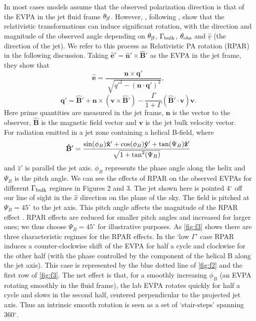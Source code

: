 	In most cases models assume that the observed polarization direction is that of the EVPA in the jet fluid frame $\theta_{\rm jf}$. However, \citet{lyutikov_polarization_2003}, following  \citet{blandford_relativistic_1979}, show that the relativistic transformations can induce significant rotation, with the direction and magnitude of the observed angle depending on $\theta_{\rm jf}$, $\Gamma_{\rm bulk}$, $\theta_{\rm obs}$ and $\underline{\hat{v}}$ (the direction of the jet). We refer to this process as Relativistic PA rotation (RPAR) in the following discussion. Taking $\mathbf{\hat{e}' = \hat{n}' \times \hat{B}'}$ as the EVPA in the jet frame, they show that 
\begin{equation}
\mathbf{\hat{e}} = \frac{\mathbf{n \times q'}}{\sqrt[]{q'^2 - (\mathbf{n \cdot q'})^2}},
\end{equation}
\begin{equation}
\mathbf{q'} = \mathbf{\hat{B}' + n \times (v \times \hat{B}')} - \frac{\Gamma}{1+\Gamma}(\mathbf{\hat{B}' \cdot v})\mathbf{v}.
\end{equation}
Here prime quantities are measured in the jet frame, $\mathbf{n}$ is the vector to the observer, $\mathbf{\hat{B}}$ is the magnetic field vector and $\mathbf{v}$ is the jet bulk velocity vector.\\

For radiation emitted in a jet zone containing a helical B-field, where
\begin{equation}
\mathbf{\hat{B}'} = \frac{{\rm sin}(\phi_B)\mathbf{\hat{x}'} + {\rm cos}(\phi_B)\mathbf{\hat{y}'} + {\rm tan}(\Psi_B)\mathbf{\hat{z}'}}{\sqrt{1+{\rm tan}^2(\Psi_B)}}
\end{equation}
and $\hat{z}'$ is parallel the jet axis. $\phi_B$ represents the phase angle along the helix and $\Psi_B$ is the pitch angle.
We can see the effects of RPAR on the observed EVPAs for different $\Gamma_{\rm bulk}$ regimes in Figures 2 and 3. The jet shown here is pointed 4$^{\circ}$ off our line of sight in the $\hat{x}$ direction on the plane of the sky. The field  is pitched at $\Psi_B=45^\circ$ to the jet axis.
This pitch angle affects the magnitude of the RPAR effect \citep[as in][]{qian_intrinsic_2004}. RPAR effects are reduced for smaller pitch angles and increased for larger ones; we thus choose $\Psi_B=45^\circ$ for illustrative purposes.
As \cref{fig:f3} shows there are three characteristic regimes for the RPAR effects. In the `low $\Gamma$' case RPAR induces a counter-clockwise shift of the EVPA for half a cycle and clockwise for the other half (with the phase controlled by the component of the helical B along the jet axis). This case is represented by the blue dotted line of \cref{fig:f2} and the first row of \cref{fig:f3}. The net effect is that, for a smoothly increasing $\phi_B$ (an EVPA rotating smoothly in the fluid frame), the lab EVPA rotates quickly for half a cycle and slows in the second half, centered perpendicular to the projected jet axis. Thus an intrinsic smooth rotation is seen as a set of `stair-steps' spanning 360$^\circ$.

